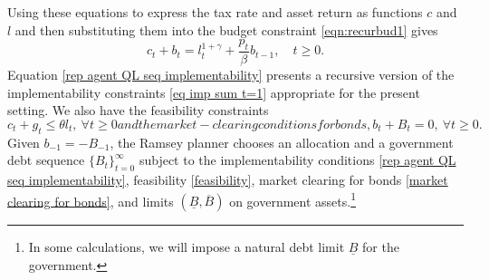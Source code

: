 \documentclass[thmsb,11pt]{article}
\begin{document}
Using these equations %
to express   the tax rate and asset return
 as functions   $c$ and $l$ and then substituting them into the  budget constraint \eqref{eqn:recurbud1} gives %
 \begin{equation} \label{rep agent QL seq implementability} c_t + b_t = l_t^{1+\gamma} + \frac{p_t}{\beta} b_{t-1}, \quad t \geq 0 .
 \end{equation}
 Equation \eqref{rep agent QL seq implementability} presents a recursive version of the implementability constraints \eqref{eq imp sum t=1} appropriate for the present setting.
We also have the feasibility constraints
\begin{subequations}
\begin{equation}
\label{feasibility}
c_t+g_t\leq\theta l_t, \ \forall t \geq 0
\end{equation}
and the market-clearing conditions for bonds,
\begin{equation}\label{market clearing for bonds} b_t+B_t=0, \ \forall t \geq 0 .\end{equation}
\end{subequations}
\noindent Given  $b_{-1}=-B_{-1}$, the Ramsey planner chooses an allocation and a government
 debt sequence $\{B_t \}_{t=0}^\infty$ subject to the implementability conditions \eqref{rep agent QL seq implementability},
feasibility \eqref{feasibility}, market clearing for bonds \eqref{market clearing for bonds},  and limits $(\underline{B},\overline{B})$ on government
assets.\footnote{In some calculations, we will impose a natural debt limit $\underline{B}$ for the government.}


\end{document}
